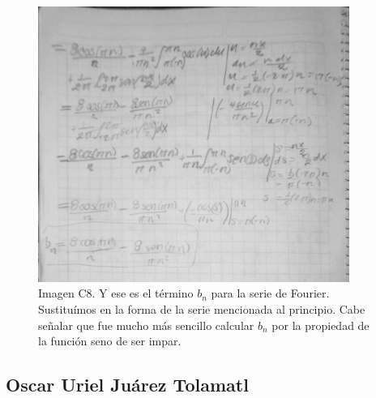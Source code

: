 \begin{figure}[H]
	\centering
	\includegraphics[width=4.00521in,height=3.53949in]{media/image41.jpg}
	\caption{Imagen C8. Y ese es el término \(b_n\) para la serie de Fourier. Sustituímos en la forma de la serie mencionada al principio. Cabe señalar que fue mucho más sencillo calcular \(b_n\) por la propiedad de la función seno de ser impar.}
\end{figure}

\subsection{Oscar Uriel Juárez Tolamatl}

